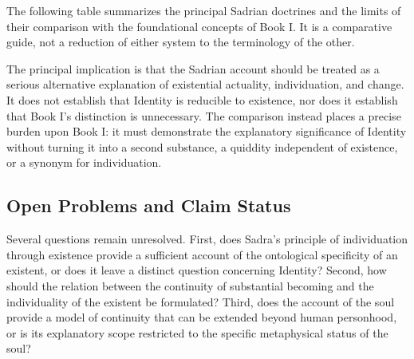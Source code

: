 \label{para:VS.B01.P01.C08.S17.SS18.P004}

The following table
summarizes the principal
Sadrian doctrines and
the limits of their
comparison with the
foundational concepts
of Book I. It is
a comparative guide,
not a reduction
of either system
to the terminology
of the other.



\label{para:VS.B01.P01.C08.S17.SS18.P005}

The principal implication
is that the Sadrian
account should be
treated as a serious
alternative explanation
of existential actuality,
individuation, and
change. It does
not establish that
Identity is reducible
to existence, nor
does it establish
that Book I's
distinction is
unnecessary. The
comparison instead
places a precise
burden upon Book I:
it must demonstrate
the explanatory
significance of
Identity without
turning it into
a second substance,
a quiddity independent
of existence, or
a synonym for
individuation.




\subsection{Open Problems and Claim Status}
\label{subsec:ch08_s17_ss19}

\label{para:VS.B01.P01.C08.S17.SS19.P001}

Several questions remain
unresolved. First,
does Sadra's principle
of individuation
through existence
provide a sufficient
account of the
ontological specificity
of an existent,
or does it leave
a distinct question
concerning Identity?
Second, how should
the relation between
the continuity of
substantial becoming
and the individuality
of the existent
be formulated? Third,
does the account
of the soul provide
a model of continuity
that can be extended
beyond human personhood,
or is its explanatory
scope restricted
to the specific
metaphysical status
of the soul?

